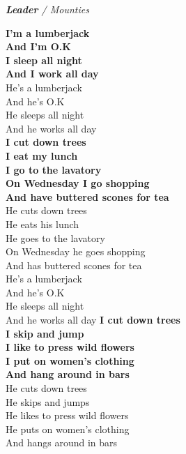 \documentclass[a6paper,10pt]{article}
\begin{document}
\setlength{\oddsidemargin}{-0.47in}
\begin{center}
\small\textit{\textbf{Leader} / Mounties}
\end{center}
\begin{lyrics}
\small 
\textbf{I'm a lumberjack\\ 
And I'm O.K\\ 
I sleep all night\\ 
And I work all day}
\vspace{5pt}\\ 
He's a lumberjack\\ 
And he's O.K\\ 
He sleeps all night\\ 
And he works all day
\vspace{5pt}\\
\textbf{I cut down trees\\ 
I eat my lunch\\ 
I go to the lavatory\\ 
On Wednesday I go shopping\\ 
And have buttered scones for tea}
\vspace{5pt}\\ 
He cuts down trees\\ 
He eats his lunch\\ 
He goes to the lavatory\\ 
On Wednesday he goes shopping\\ 
And has buttered scones for tea 
\vspace{5pt}\\
He's a lumberjack\\ 
And he's O.K\\ 
He sleeps all night\\
And he works all day
\newpage
\setlength{\oddsidemargin}{-0.37in}
\noindent
\textbf{I cut down trees\\ 
I skip and jump\\ 
I like to press wild flowers\\ 
I put on women's clothing\\ 
And hang around in bars}
\vspace{5pt}\\ 
He cuts down trees\\ 
He skips and jumps\\ 
He likes to press wild flowers\\ 
He puts on women's clothing\\ 
And hangs around in bars

\end{lyrics}
\end{document}
